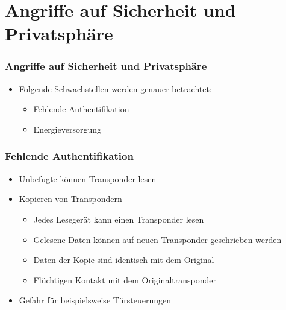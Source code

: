 \documentclass{beamer}
\begin{document}
\section{Angriffe auf Sicherheit und Privatsphäre}
\begin{frame}
\frametitle{Angriffe auf Sicherheit und Privatsphäre}

\begin{itemize}
	\item Folgende Schwachstellen werden genauer betrachtet:
	\begin{itemize}
		\item Fehlende Authentifikation
		\item Energieversorgung
	\end{itemize}
\end{itemize}
\end{frame}


\begin{frame}
\frametitle{Fehlende Authentifikation}

\begin{itemize}
	\item Unbefugte können Transponder lesen
	\item Kopieren von Transpondern
	\begin{itemize}
		\item Jedes Lesegerät kann einen Transponder lesen
		\item Gelesene Daten können auf neuen Transponder geschrieben werden
		\item Daten der Kopie sind identisch mit dem Original
		\item Flüchtigen Kontakt mit dem Originaltransponder 
	\end{itemize}
	\item Gefahr für beispielsweise Türsteuerungen
\end{itemize}
\end{frame}
\end{document}
